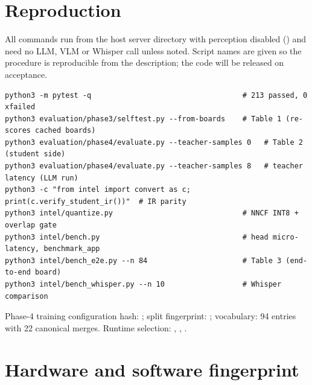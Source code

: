 \section{Reproduction}\label{app:repro}

All commands run from the host server directory with perception disabled
() and need no LLM, VLM or Whisper call unless
noted. Script names are given so the
procedure is reproducible from the description; the code will be released on
acceptance.
\begin{small}
\begin{verbatim}
python3 -m pytest -q                                   # 213 passed, 0 xfailed
python3 evaluation/phase3/selftest.py --from-boards    # Table 1 (re-scores cached boards)
python3 evaluation/phase4/evaluate.py --teacher-samples 0   # Table 2 (student side)
python3 evaluation/phase4/evaluate.py --teacher-samples 8   # teacher latency (LLM run)
python3 -c "from intel import convert as c; print(c.verify_student_ir())"  # IR parity
python3 intel/quantize.py                              # NNCF INT8 + overlap gate
python3 intel/bench.py                                 # head micro-latency, benchmark_app
python3 intel/bench_e2e.py --n 84                      # Table 3 (end-to-end board)
python3 intel/bench_whisper.py --n 10                  # Whisper comparison
\end{verbatim}
\end{small}
Phase-4 training configuration hash: ; split fingerprint:
; vocabulary: 94 entries with 22 canonical merges.
Runtime selection: ,
, .

\section{Hardware and software fingerprint}\label{app:hw}

